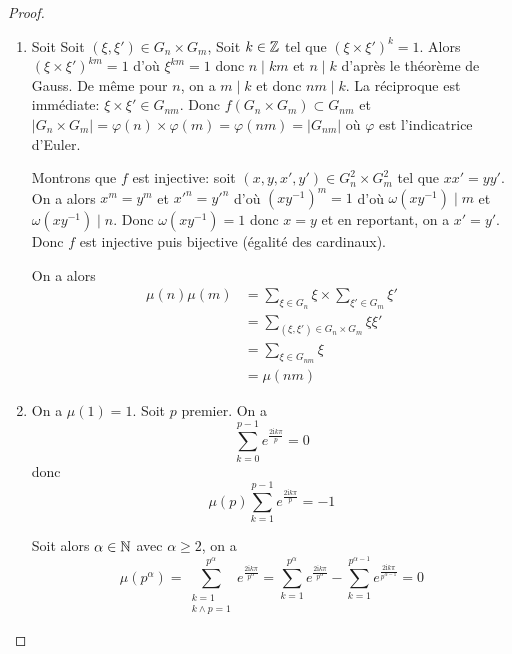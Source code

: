 \begin{proof}
	\phantom{}
	\begin{enumerate}
		\item Soit 
		Soit $(\xi,\xi')\in G_{n}\times G_{m}$, Soit $k\in\mathbb{Z}$ tel que $(\xi\times\xi')^{k}=1$. Alors $(\xi\times\xi')^{km}=1$ d'où $\xi^{km}=1$ donc $n\mid km$ et $n\mid k$ d'après le théorème de Gauss. De même pour $n$, on a $m\mid k$ et donc $nm\mid k$. La réciproque est immédiate: $\xi\times\xi'\in G_{nm}$. Donc $f(G_{n}\times G_{m})\subset G_{nm}$ et $\vert G_{n}\times G_{m}\vert=\varphi(n)\times\varphi(m)=\varphi(nm)=\vert G_{nm}\vert$ où $\varphi$ est l'indicatrice d'Euler.

		Montrons que $f$ est injective: soit $(x,y,x',y')\in G_{n}^{2}\times G_{m}^{2}$ tel que $xx'=yy'$. On a alors $x^{m}=y^{m}$ et $x'^{n}=y'^{n}$ d'où $(xy^{-1})^{m}=1$ d'où $\omega(xy^{-1})\mid m$ et $\omega(xy^{-1})\mid n$. Donc $\omega(xy^{-1})=1$ donc $x=y$ et en reportant, on a $x'=y'$. Donc $f$ est injective puis bijective (égalité des cardinaux).

		On a alors 
		\begin{align}
			\mu(n)\mu(m)
			&=\sum_{\xi\in G_{n}}\xi\times\sum_{\xi'\in G_{m}}\xi'\\
			&=\sum_{(\xi,\xi')\in G_{n}\times G_{m}}\xi\xi'\\
			&=\sum_{\xi\in G_{nm}}\xi\\
			&=\boxed{\mu(nm)}
		\end{align}

		\item On a $\mu(1)=1$. Soit $p$ premier. On a 
		\begin{equation}
			\sum_{k=0}^{p-1}e^{\frac{2\mathrm{i}k\pi}{p}}=0
		\end{equation} 
		donc 
		\begin{equation}
			\mu(p)\sum_{k=1}^{p-1}e^{\frac{2\mathrm{i}k\pi}{p}}=-1	
		\end{equation}
		
		Soit alors $\alpha\in\mathbb{N}$ avec $\alpha\geqslant2$, on a 
		\begin{equation}
			\boxed{
			\mu(p^{\alpha})=\sum_{\substack{k=1\\ k\wedge p=1}}^{p^{\alpha}}e^{\frac{2\mathrm{i}k\pi}{p^{\alpha}}}=\sum_{k=1}^{p^{\alpha}}e^{\frac{2\mathrm{i}k\pi}{p^{\alpha}}}-\sum_{k=1}^{p^{\alpha-1}}e^{\frac{2\mathrm{i}k\pi}{p^{\alpha-1}}}=0}
		\end{equation}


\end{enumerate}
\end{proof}
